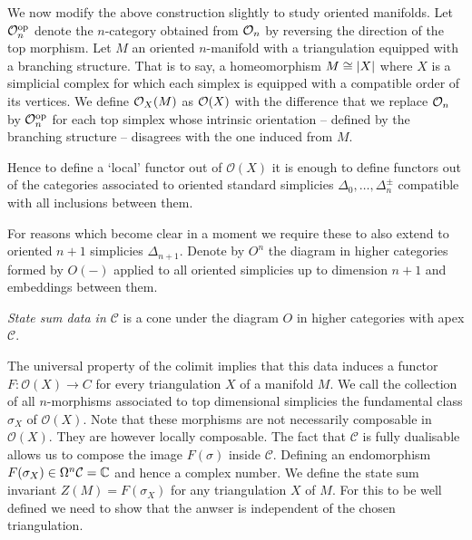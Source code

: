 We now modify the above construction slightly to study oriented manifolds.
Let $\mathcal{O}_n^{\mathrm{op}}$ denote the $n$-category obtained from $\mathcal{O}_n$ by reversing the direction of the top morphism.
Let $M$ an oriented $n$-manifold with a triangulation equipped with a branching structure.
That is to say, a homeomorphism $M \cong \lvert X\rvert$ where $X$ is a simplicial complex for which each simplex is equipped with a compatible order of its vertices.
We define $\mathcal{O}_X(M)$ as $\mathcal{O}(X)$ with the difference that we replace $\mathcal{O}_n$ by $\mathcal{O}_n^{\mathrm{op}}$ for each top simplex whose intrinsic orientation -- defined by the branching structure -- disagrees with the one induced from $M$.

Hence to define a `local' functor out of $\mathcal{O}(X)$ it is enough to define functors out of the categories associated to oriented standard simplicies $\Delta_0,\dots , \Delta_n^\pm$ compatible with all inclusions between them.

For reasons which become clear in a moment we require these to also extend to oriented $n+1$ simplicies $\Delta_{n+1}$.
Denote by $O^n$ the diagram in higher categories formed by $O(-)$ applied to all oriented simplicies up to dimension $n+1$ and embeddings between them.

\begin{definition}
	\emph{State sum data in $\mathcal{C}$} is a cone under the diagram $O$ in higher categories with apex $\mathcal{C}$.
\end{definition}

The universal property of the colimit implies that this data induces a functor $F\colon \mathcal{O}(X)\longrightarrow C $ for every triangulation $X$ of a manifold $M$.
We call the collection of all $n$-morphisms associated to top dimensional simplicies the fundamental class $\sigma_X$ of $\mathcal{O}(X)$.
Note that these morphisms are not necessarily composable in $\mathcal{O}(X)$.
They are however locally composable.
The fact that $\mathcal{C}$ is fully dualisable
allows us to compose the image $F(\sigma)$ inside $\mathcal{C}$.
Defining an endomorphism
$F(\sigma_X)\in \Omega^n\mathcal{C}=\mathbb{C} $ and hence a complex number.
We define the state sum invariant $Z(M)=F(\sigma_X)$ for any triangulation $X$ of $M$.
For this to be well defined we need to show that the anwser is independent of the chosen triangulation.

